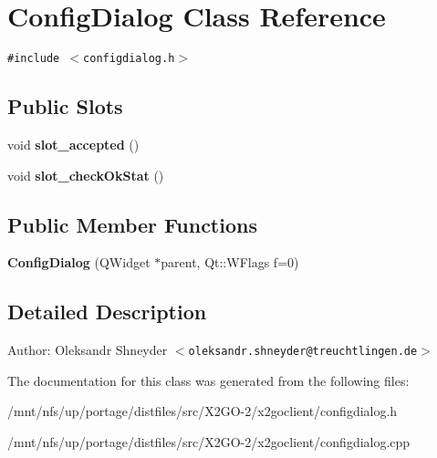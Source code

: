 \section{Config\-Dialog Class Reference}
\label{classConfigDialog}
{\tt \#include $<$configdialog.h$>$}

\subsection*{Public Slots}
\begin{CompactItemize}
\item 
void \textbf{slot\_\-accepted} ()\label{classConfigDialog_9f04d8b7c801f239998cfa628f2183da}

\item 
void \textbf{slot\_\-check\-Ok\-Stat} ()\label{classConfigDialog_6b6b036fe8df7b347fd3772f4e7f6fef}

\end{CompactItemize}
\subsection*{Public Member Functions}
\begin{CompactItemize}
\item 
\textbf{Config\-Dialog} (QWidget $\ast$parent, Qt::WFlags f=0)\label{classConfigDialog_796cb9b0d5b50af3f1d5d31de53e8c69}

\end{CompactItemize}


\subsection{Detailed Description}
\begin{Desc}
\item[Author:]Oleksandr Shneyder $<$\tt{oleksandr.shneyder@treuchtlingen.de}$>$ \end{Desc}




The documentation for this class was generated from the following files:\begin{CompactItemize}
\item 
/mnt/nfs/up/portage/distfiles/src/X2GO-2/x2goclient/configdialog.h\item 
/mnt/nfs/up/portage/distfiles/src/X2GO-2/x2goclient/configdialog.cpp\end{CompactItemize}
